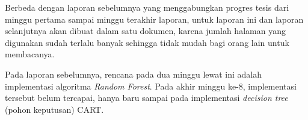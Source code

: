 Berbeda dengan laporan sebelumnya yang menggabungkan progres tesis dari minggu
pertama sampai minggu terakhir laporan, untuk laporan ini dan laporan
selanjutnya akan dibuat dalam satu dokumen, karena jumlah halaman yang
digunakan sudah terlalu banyak sehingga tidak mudah bagi orang lain untuk
membacanya.

Pada laporan sebelumnya, rencana pada dua minggu lewat ini adalah implementasi
algoritma \textit{Random Forest}.
Pada akhir minggu ke-8, implementasi tersebut belum tercapai, hanya baru sampai
pada implementasi \textit{decision tree} (pohon keputusan) CART.

